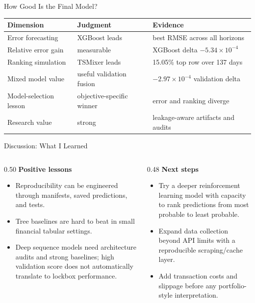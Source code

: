 \documentclass[aspectratio=169]{beamer}
\begin{document}
\begin{frame}{How Good Is the Final Model?}
\begin{center}
\small
\begin{tabular}{@{}lll@{}}
\toprule
Dimension & Judgment & Evidence \\
\midrule
Error forecasting & XGBoost leads & best RMSE across all horizons \\
Relative error gain & measurable & XGBoost delta $-5.34\times10^{-4}$ \\
Ranking simulation & TSMixer leads & 15.05\% top row over 137 days \\
Mixed model value & useful validation fusion & $-2.97\times10^{-4}$ validation delta \\
Model-selection lesson & objective-specific winner & error and ranking diverge \\
Research value & strong & leakage-aware artifacts and audits \\
\bottomrule
\end{tabular}
\end{center}
\end{frame}

\begin{frame}{Discussion: What I Learned}
\begin{columns}[T]
\begin{column}{0.50\textwidth}
\textbf{Positive lessons}
\begin{itemize}
  \item Reproducibility can be engineered through manifests, saved predictions, and tests.
  \item Tree baselines are hard to beat in small financial tabular settings.
  \item Deep sequence models need architecture audits and strong baselines; high validation score does not automatically translate to lockbox performance.
\end{itemize}
\end{column}
\begin{column}{0.48\textwidth}
\textbf{Next steps}
\begin{itemize}
  \item Try a deeper reinforcement learning model with capacity to rank predictions from most probable to least probable.
  \item Expand data collection beyond API limits with a reproducible scraping/cache layer.
  \item Add transaction costs and slippage before any portfolio-style interpretation.
\end{itemize}
\end{column}
\end{columns}
\end{frame}
\end{document}

